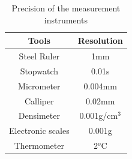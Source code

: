 \documentclass[12pt]{article}
\begin{document}
\begin{table}[H]
\centering
\begin{tabular}{|c|c|}
\hline
Tools             & Resolution \\ \hline
Steel Ruler       & 1mm        \\ \hline
Stopwatch         & 0.01s      \\ \hline
Micrometer        & 0.004mm    \\ \hline
Calliper          & 0.02mm     \\ \hline
Densimeter        & 0.001g/cm$^3$      \\ \hline
Electronic scales & 0.001g     \\ \hline
Thermometer       & 2$^o$C          \\ \hline
\end{tabular}
\caption{Precision of the measurement instruments}
\end{table}
\end{document}
